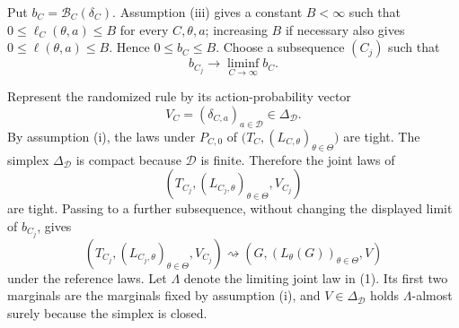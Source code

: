 Put \(b_C=\mathcal B_C(\delta_C)\).  Assumption (iii) gives a constant \(B<\infty\) such that \(0\leq\ell_C(\theta,a)\leq B\) for every \(C,\theta,a\); increasing \(B\) if necessary also gives \(0\leq\ell(\theta,a)\leq B\).  Hence \(0\leq b_C\leq B\).  Choose a subsequence \((C_j)\) such that
\[
 b_{C_j}\longrightarrow\liminf_{C\to\infty}b_C.
\]

Represent the randomized rule by its action-probability vector
\[
 V_C=(\delta_{C,a})_{a\in\mathcal D}\in\Delta_{\mathcal D}.
\]
By assumption (i), the laws under \(P_{C,0}\) of
\(\bigl(T_C,(L_{C,\theta})_{\theta\in\Theta}\bigr)\) are tight.  The simplex \(\Delta_{\mathcal D}\) is compact because \(\mathcal D\) is finite.  Therefore the joint laws of
\[
 \left(T_{C_j},(L_{C_j,\theta})_{\theta\in\Theta},V_{C_j}\right)
\]
are tight.  Passing to a further subsequence, without changing the displayed limit of \(b_{C_j}\), gives
\[
 \left(T_{C_j},(L_{C_j,\theta})_{\theta\in\Theta},V_{C_j}\right)
 \rightsquigarrow
 \left(G,(L_\theta(G))_{\theta\in\Theta},V\right)
 \tag{1}
\]
under the reference laws.  Let \(\Lambda\) denote the limiting joint law in (1).  Its first two marginals are the marginals fixed by assumption (i), and \(V\in\Delta_{\mathcal D}\) holds \(\Lambda\)-almost surely because the simplex is closed.

